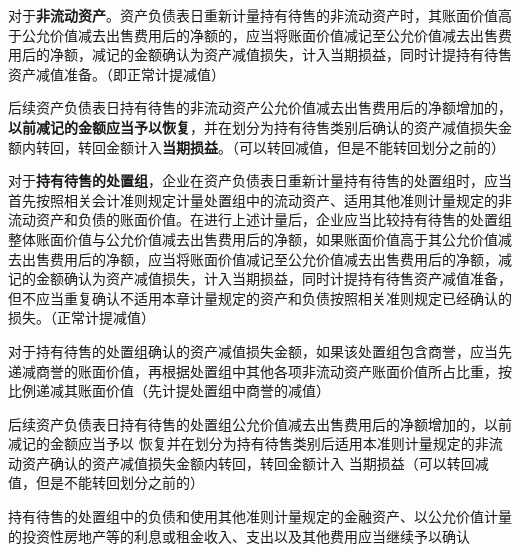 \documentclass[UTF8,12pt]{ctexart}
\numberwithin{equation}{section} %
\numberwithin{figure}{section}
\numberwithin{table}{section}
\begin{document}
	对于\textbf{非流动资产}。资产负债表日重新计量持有待售的非流动资产时，其账面价值高于公允价值减去出售费用后的净额的，应当将账面价值减记至公允价值减去出售费用后的净额，减记的金额确认为资产减值损失，计入当期损益，同时计提持有待售资产减值准备。（即正常计提减值）
	
	后续资产负债表日持有待售的非流动资产公允价值减去出售费用后的净额增加的，\textbf{以前减记的金额应当予以恢复}，并在划分为持有待售类别后确认的资产减值损失金额内转回，转回金额计入\textbf{当期损益}。（可以转回减值，但是不能转回划分之前的）
	
	对于\textbf{持有待售的处置组}，企业在资产负债表日重新计量持有待售的处置组时，应当首先按照相关会计准则规定计量处置组中的流动资产、适用其他准则计量规定的非流动资产和负债的账面价值。在进行上述计量后，企业应当比较持有待售的处置组整体账面价值与公允价值减去出售费用后的净额，如果账面价值高于其公允价值减去出售费用后的净额，应当将账面价值减记至公允价值减去出售费用后的净额，减记的金额确认为资产减值损失，计入当期损益，同时计提持有待售资产减值准备，但不应当重复确认不适用本章计量规定的资产和负债按照相关准则规定已经确认的损失。（正常计提减值）
	
	对于持有待售的处置组确认的资产减值损失金额，如果该处置组包含商誉，应当先递减商誉的账面价值，再根据处置组中其他各项非流动资产账面价值所占比重，按比例递减其账面价值（先计提处置组中商誉的减值）
	
	后续资产负债表日持有待售的处置组公允价值减去出售费用后的净额增加的，以前减记的金额应当予以 恢复并在划分为持有待售类别后适用本准则计量规定的非流动资产确认的资产减值损失金额内转回，转回金额计入 当期损益（可以转回减值，但是不能转回划分之前的）
	
	
	持有待售的处置组中的负债和使用其他准则计量规定的金融资产、以公允价值计量的投资性房地产等的利息或租金收入、支出以及其他费用应当继续予以确认
	
\end{document}
